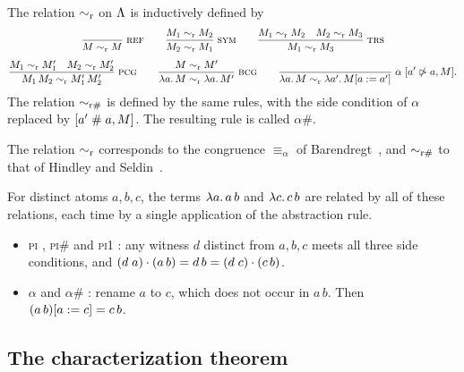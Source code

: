 \begin{definition}
\label{def:simr}
The relation $\simr$
on $\Lam$ is inductively defined by
\begin{gather*}
  \infrule{ref}{}{M \simr M}
  \qquad
  \infrule{sym}{M_1 \simr M_2}{M_2 \simr M_1}
  \qquad
  \infrule{trs}{M_1 \simr M_2 \quad M_2 \simr M_3}{M_1 \simr M_3}
  \\[1ex]
  \infrule{pcg}{M_1 \simr M_1' \quad M_2 \simr M_2'}
               {M_1\, M_2 \simr M_1'\, M_2'}
  \qquad
  \infrule{bcg}{M \simr M'}{\lam{a}{M} \simr \lam{a}{M'}}
  \qquad
  \infrule{$\alpha$}{}{\lam{a}{M} \simr \lam{a'}{\subst{M}{a}{a'}}}
  \; [a' \nocc a, M].
\end{gather*}
The relation $\simrf$
is defined by the same rules, with the side condition of $\alpha$
replaced by $[a' \fresh a, M]$. The resulting rule is called $\alpha\#$.
\end{definition}

The relation $\simr$ corresponds to the congruence $\equiv_\alpha$
of Barendregt~\cite[Definition~2.1.11]{barendregt1985a}, and $\simrf$
to that of Hindley and Seldin~\cite[Definition~1.17]{hindley2008a}.

\begin{example}
\label{ex:five-relations}
For distinct atoms $a, b, c$, the terms $\lam{a}{a\,b}$ and
$\lam{c}{c\,b}$ are related by all of these relations, each time by a
single application of the abstraction rule.
\begin{itemize}
  \item \textsc{pi}
    ,
    \textsc{pi\#}
    and \textsc{pi1}
    : any witness $d$ distinct from $a, b, c$
    meets all three side conditions, and
    $\sw{d}{a} \act (a\,b) = d\,b = \sw{d}{c} \act (c\,b)$.
  \item $\alpha$
    and $\alpha\#$
    : rename $a$ to $c$, which does not occur in
    $a\,b$. Then $\subst{(a\,b)}{a}{c} = c\,b$.
\end{itemize}
\end{example}

\subsection{The characterization theorem}
\label{subsec:equivalence-theorem}

